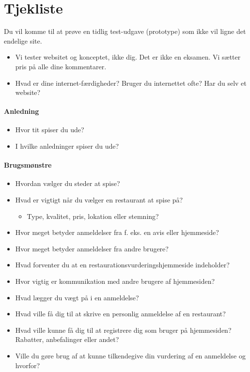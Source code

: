 \documentclass[a4paper, 12pt]{article}
\begin{document}

\newpage
\setcounter{page}{1}
\fancyfoot[C]{\thepage}

\section*{Tjekliste}

Du vil komme til at prøve en tidlig test-udgave (prototype) som ikke vil ligne det endelige site.
\begin{itemize}
\item Vi tester websitet og konceptet, ikke dig. Det er ikke en
  eksamen. Vi sætter pris på alle dine kommentarer.
\item Hvad er dine internet-færdigheder? Bruger du internettet ofte?
  Har du selv et website?
\end{itemize}

\paragraph{Anledning}
\begin{itemize}
\item Hvor tit spiser du ude?
\item I hvilke anledninger spiser du ude?
\end{itemize}

\paragraph{Brugsmønstre}
\begin{itemize}
\item Hvordan vælger du steder at spise?
\item Hvad er vigtigt når du vælger en restaurant at spise på?
  \begin{itemize}
  \item Type, kvalitet, pris, lokation eller stemning?
  \end{itemize}
\item Hvor meget betyder anmeldelser fra f. eks. en avis eller hjemmeside?
\item Hvor meget betyder anmeldelser fra andre brugere?
\item Hvad forventer du at en restaurationsvurderingshjemmeside indeholder?
\item Hvor vigtig er kommunikation med andre brugere af hjemmesiden?
\item Hvad lægger du vægt på i en anmeldelse?
\item Hvad ville få dig til at skrive en personlig anmeldelse af en restaurant?
\item Hvad ville kunne få dig til at registrere dig som bruger på hjemmesiden?
Rabatter, anbefalinger eller andet?
\item Ville du gøre brug af at kunne tilkendegive din vurdering af en anmeldelse
og hvorfor?
\end{itemize}
\end{document}

